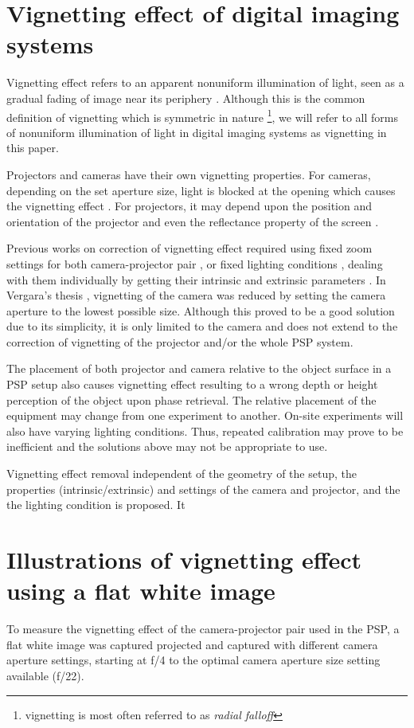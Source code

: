 \section{Vignetting effect of digital imaging systems}

Vignetting effect refers to an apparent nonuniform illumination of light, seen as a gradual fading of image near its periphery \cite{Hecht2007}. 
Although this is the common definition of vignetting which is symmetric in nature \footnote{vignetting is most often referred to as \textit{radial falloff}}, we will refer to all forms of nonuniform illumination of light in digital imaging systems as vignetting in this paper.

Projectors and cameras have their own vignetting properties. 
For cameras, depending on the set aperture size, light is blocked at the opening which causes the vignetting effect \cite{Hecht2007}. 
For projectors, it may depend upon the position and orientation of the projector and even the reflectance property of the screen \cite{Juang2007}. 

Previous works on correction of vignetting effect required using fixed zoom settings for both camera-projector pair \cite{Juang2007}, or fixed lighting conditions \cite{}, dealing with them individually by getting their intrinsic and extrinsic parameters \cite{Goldman2010}. 
In Vergara's thesis \cite{Vergara2010}, vignetting of the camera was reduced by setting the camera aperture to the lowest possible size. Although this proved to be a good solution due to its simplicity, it is only limited to the camera and does not extend to the correction of vignetting of the projector and/or the whole PSP system.

The placement of both projector and camera relative to the object surface in a PSP setup also causes vignetting effect resulting to a wrong depth or height perception of the object upon phase retrieval. The relative placement of the equipment may change from one experiment to another. On-site experiments will also have varying lighting conditions. Thus, repeated calibration may prove to be inefficient and the solutions above may not be appropriate to use. 

Vignetting effect removal independent of the geometry of the setup, the properties (intrinsic/extrinsic)  and settings of the camera and projector, and the the lighting condition is proposed. It 

\section{Illustrations of vignetting effect using a flat white image}
To measure the vignetting effect of the camera-projector pair used in the PSP, a flat white image was captured projected and captured with different camera aperture settings, starting at f/4 to the optimal camera aperture size setting available (f/22). 

